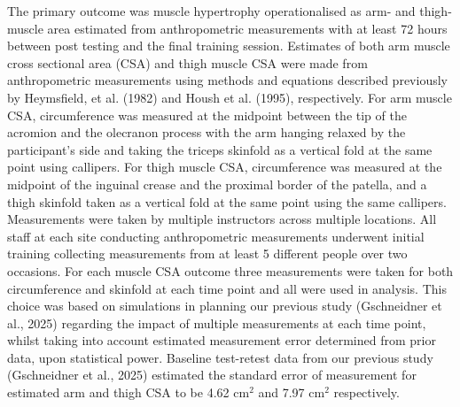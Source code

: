 \documentclass[
]{article}
\begin{document}
The primary outcome was muscle hypertrophy operationalised as arm- and
thigh- muscle area estimated from anthropometric measurements with at
least 72 hours between post testing and the final training session.
Estimates of both arm muscle cross sectional area (CSA) and thigh muscle
CSA were made from anthropometric measurements using methods and
equations described previously by Heymsfield, et al. (1982) and Housh et
al. (1995), respectively. For arm muscle CSA, circumference was measured
at the midpoint between the tip of the acromion and the olecranon
process with the arm hanging relaxed by the participant's side and
taking the triceps skinfold as a vertical fold at the same point using
callipers. For thigh muscle CSA, circumference was measured at the
midpoint of the inguinal crease and the proximal border of the patella,
and a thigh skinfold taken as a vertical fold at the same point using
the same callipers. Measurements were taken by multiple instructors
across multiple locations. All staff at each site conducting
anthropometric measurements underwent initial training collecting
measurements from at least 5 different people over two occasions. For
each muscle CSA outcome three measurements were taken for both
circumference and skinfold at each time point and all were used in
analysis. This choice was based on simulations in planning our previous
study (Gschneidner et al., 2025) regarding the impact of multiple
measurements at each time point, whilst taking into account estimated
measurement error determined from prior data, upon statistical power.
Baseline test-retest data from our previous study (Gschneidner et al.,
2025) estimated the standard error of measurement for estimated arm and
thigh CSA to be 4.62 \(\textrm{cm}^2\) and 7.97 \(\textrm{cm}^2\)
respectively.
\end{document}
